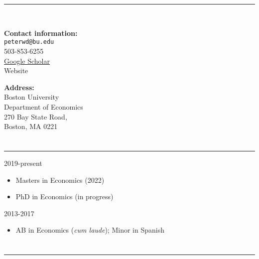 \documentclass[12pt]{article}
\newenvironment{customitemize}
{ \begin{itemize}[leftmargin=\parindent, topsep = 1pt, itemsep = -1pt] }
{\end{itemize} }
\begin{document}
\normalsize
\singlespacing



\section*{\centering {}} 
\begin{center}
\rule{3in}{1pt} \\
\vspace*{0.1in}

\begin{minipage}[t]{3in}
\textbf{Contact information:} \\
\texttt{peterwd@bu.edu} \\
503-853-6255 \\
\href{https://scholar.google.com/citations?user=zMlunv0AAAAJ&hl=en}{Google Scholar} \\
Website \\
\end{minipage}
\hfill
\begin{minipage}[t]{2.0in}
\textbf{Address:}\\
Boston University \\
Department of Economics \\
270 Bay State Road, \\
Boston, MA 0221
\end{minipage}

\end{center} 

\section*{}
\noindent \rule{\textwidth}{1pt} 
  \hfill 2019-present 
\begin{customitemize}
	\item Masters in Economics (2022)
	\item PhD in Economics (in progress)
\end{customitemize}
  \hfill 2013-2017 
\begin{customitemize}
	\item AB in Economics (\emph{cum laude}); Minor in Spanish
\end{customitemize}

\section*{}
\noindent \rule{\textwidth}{1pt} 
\end{document}
